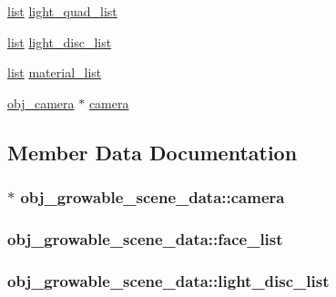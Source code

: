 \begin{DoxyCompactItemize}
\item 
\hyperlink{structlist}{list} \hyperlink{structobj__growable__scene__data_a64d1574b4bae19b123e8cb3f6688555f}{light\+\_\+quad\+\_\+list}
\item 
\hyperlink{structlist}{list} \hyperlink{structobj__growable__scene__data_a774c6e71151e61488452babc59db667c}{light\+\_\+disc\+\_\+list}
\item 
\hyperlink{structlist}{list} \hyperlink{structobj__growable__scene__data_ad271be9b71b2dfd6fbadd5bf69e74bf5}{material\+\_\+list}
\item 
\hyperlink{structobj__camera}{obj\+\_\+camera} $\ast$ \hyperlink{structobj__growable__scene__data_a44df213a8051ff348dbeba280ee7112c}{camera}
\end{DoxyCompactItemize}


\subsection{Member Data Documentation}
\hypertarget{structobj__growable__scene__data_a44df213a8051ff348dbeba280ee7112c}{
\subsubsection[{camera}]{$\ast$ obj\+\_\+growable\+\_\+scene\+\_\+data\+::camera}}\label{structobj__growable__scene__data_a44df213a8051ff348dbeba280ee7112c}
\hypertarget{structobj__growable__scene__data_a371039f614baf3b51c079d577ed8247a}{
\subsubsection[{face\+\_\+list}]{ obj\+\_\+growable\+\_\+scene\+\_\+data\+::face\+\_\+list}}\label{structobj__growable__scene__data_a371039f614baf3b51c079d577ed8247a}
\hypertarget{structobj__growable__scene__data_a774c6e71151e61488452babc59db667c}{
\subsubsection[{light\+\_\+disc\+\_\+list}]{ obj\+\_\+growable\+\_\+scene\+\_\+data\+::light\+\_\+disc\+\_\+list}}\label{structobj__growable__scene__data_a774c6e71151e61488452babc59db667c}
